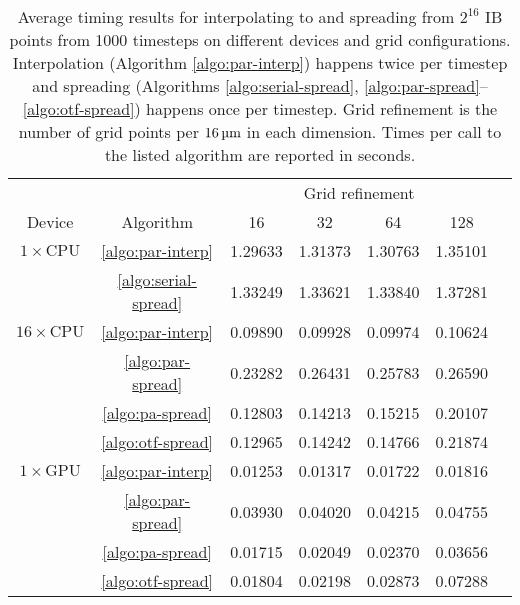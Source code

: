 \begin{table}
    \begin{center}
    \bgroup
    \renewcommand{\arraystretch}{1.7}
    \begin{tabular}{ccccccc}
                                                                                              \toprule
                             &                          & \multicolumn{4}{c}{Grid refinement}   \\ \cline{3-6}
        Device               & Algorithm                & 16      & 32      & 64      & 128     \\ \midrule
        $1\times\text{CPU}$  & \ref{algo:par-interp}    & 1.29633 & 1.31373 & 1.30763 & 1.35101 \\
                             & \ref{algo:serial-spread} & 1.33249 & 1.33621 & 1.33840 & 1.37281 \\ \midrule
        $16\times\text{CPU}$ & \ref{algo:par-interp}    & 0.09890 & 0.09928 & 0.09974 & 0.10624 \\
                             & \ref{algo:par-spread}    & 0.23282 & 0.26431 & 0.25783 & 0.26590 \\
                             & \ref{algo:pa-spread}     & 0.12803 & 0.14213 & 0.15215 & 0.20107 \\
                             & \ref{algo:otf-spread}    & 0.12965 & 0.14242 & 0.14766 & 0.21874 \\ \midrule
        $1\times\text{GPU}$  & \ref{algo:par-interp}    & 0.01253 & 0.01317 & 0.01722 & 0.01816 \\
                             & \ref{algo:par-spread}    & 0.03930 & 0.04020 & 0.04215 & 0.04755 \\
                             & \ref{algo:pa-spread}     & 0.01715 & 0.02049 & 0.02370 & 0.03656 \\
                             & \ref{algo:otf-spread}    & 0.01804 & 0.02198 & 0.02873 & 0.07288 \\ \bottomrule
    \end{tabular}
    \egroup
    \end{center}
    \caption{%
Average timing results for interpolating to and spreading from $2^{16}$ IB points from
1000 timesteps on different devices and grid configurations. Interpolation (Algorithm
\ref{algo:par-interp}) happens twice per timestep and spreading (Algorithms
\ref{algo:serial-spread}, \ref{algo:par-spread}--\ref{algo:otf-spread}) happens once per
timestep. Grid refinement is the number of grid points per $16\um$ in each dimension.
Times per call to the listed algorithm are reported in seconds.
    }
    \label{tab:grid-timing}
\end{table}


